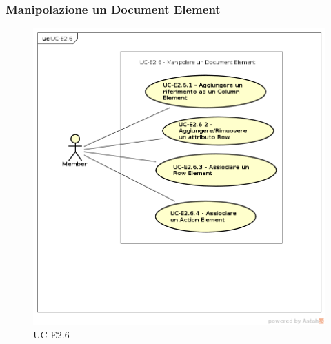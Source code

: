 \subsubsection{Manipolazione un Document Element}
 

    \begin{figure}[H]
      \begin{center}
        \includegraphics[width=12cm]{res/img/UCEditor/UC-E2.6.png}
      \caption{UC-E2.6 - }
      \end{center} 
    \end{figure}

